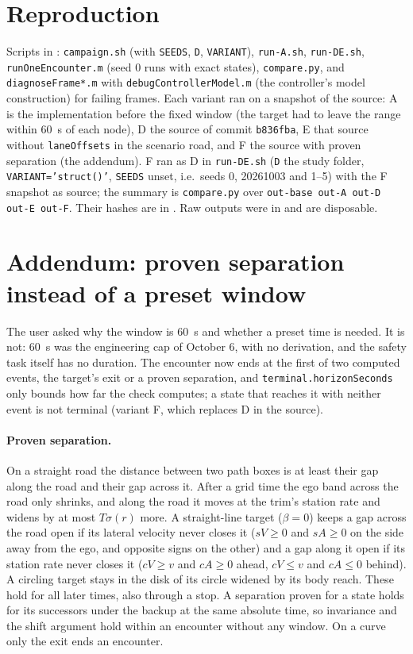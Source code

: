 \documentclass[11pt]{article}
\begin{document}
\section{Reproduction}
Scripts in : \texttt{campaign.sh}
(with \texttt{SEEDS}, \texttt{D}, \texttt{VARIANT}), \texttt{run-A.sh},
\texttt{run-DE.sh}, \texttt{runOneEncounter.m} (seed 0 runs with exact
states), \texttt{compare.py}, and \texttt{diagnoseFrame*.m} with
\texttt{debugControllerModel.m} (the controller's model construction) for
failing frames. Each variant ran on a snapshot of the source: A is the
implementation before the fixed window (the target had to leave the range
within 60~s of each node), D the source of commit \texttt{b836fba}, E that
source without \texttt{laneOffsets} in the scenario road, and F the source
with proven separation (the addendum). F ran as D in \texttt{run-DE.sh}
(\texttt{D} the study folder, \texttt{VARIANT='struct()'}, \texttt{SEEDS}
unset, i.e.\ seeds 0, 20261003 and 1--5) with the F snapshot as source; the
summary is \texttt{compare.py} over \texttt{out-base out-A out-D out-E out-F}. Their hashes are in
. Raw outputs were in
 and are
disposable.

\section{Addendum: proven separation instead of a preset window}
The user asked why the window is 60~s and whether a preset time is needed.
It is not: 60~s was the engineering cap of October 6, with no derivation, and
the safety task itself has no duration. The encounter now ends at the first of
two computed events, the target's exit or a proven separation, and
\texttt{terminal.horizonSeconds} only bounds how far the check computes; a
state that reaches it with neither event is not terminal (variant F, which
replaces D in the source).

\paragraph{Proven separation.} On a straight road the distance between two
path boxes is at least their gap along the road and their gap across it.
After a grid time the ego band across the road only shrinks, and along the
road it moves at the trim's station rate and widens by at most
$T\sigma(r)$ more. A straight-line target ($\beta=0$) keeps a gap across the
road open if its lateral velocity never closes it ($sV\ge0$ and $sA\ge0$ on
the side away from the ego, and opposite signs on the other) and a gap along it
open if its station rate never closes it ($cV\ge v$ and $cA\ge0$ ahead,
$cV\le v$ and $cA\le0$ behind). A circling target stays in the disk of its
circle widened by its body reach. These hold for all later times, also
through a stop. A separation proven for a state holds for its successors
under the backup at the same absolute time, so invariance and the shift
argument hold within an encounter without any window. On a curve only the
exit ends an encounter.
\end{document}
